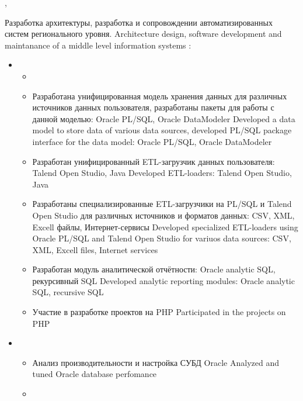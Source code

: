 \documentclass[11pt,a4paper,sans, russian]{moderncv}        %
\begin{document}
{\protect{}}
{\cityperm, \country}
{}
{
	{Разработка архитектуры, разработка и сопровождении автоматизированных систем регионального уровня.}
	{Architecture design, software development and maintanance of a middle level information systems}
  \newline{}
	\achievements:
	\begin{itemize}
	\item {}
		\begin{itemize}
			\item {}
			\item {}
				{Разработана унифицированная модель хранения данных для различных источников данных пользователя, разработаны пакеты для работы с данной моделью: Oracle PL/SQL, Oracle DataModeler}
				{Developed a data model to store data of various data sources, developed PL/SQL package interface for the data model: Oracle PL/SQL, Oracle DataModeler}
			\item {}
				{Разработан унифицированный ETL-загрузчик данных пользователя: Talend Open Studio, Java}
				{Developed ETL-loaders: Talend Open Studio, Java}
			\item {}
				{Разработаны специализированные ETL-загрузчики на PL/SQL и Talend Open Studio для различных источников и форматов данных: CSV, XML, Excell файлы, Интернет-сервисы}
				{Developed specialized ETL-loaders using Oracle PL/SQL and Talend Open Studio for variuos data sources: CSV, XML, Excell files, Internet services}
			\item {}
				{Разработан модуль аналитической отчётности: Oracle analytic SQL, рекурсивный SQL}		
				{Developed analytic reporting modules: Oracle analytic SQL, recursive SQL}
			\item {}
				{Участие в разработке проектов на PHP}
				{Participated in the projects on PHP}
		\end{itemize}
	\item {}
		\begin{itemize}
			\item {}
				{Анализ производительности и настройка СУБД Oracle}
				{Analyzed and tuned Oracle database perfomance}
			\item {}

\end{itemize}
\end{itemize}}
\end{document}
